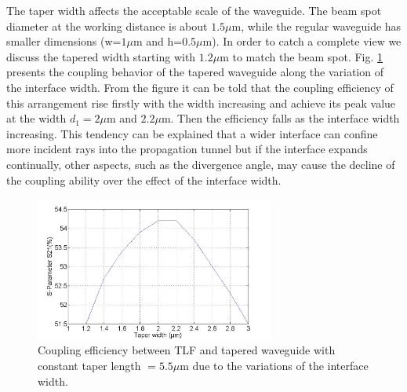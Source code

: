 The taper width affects the acceptable scale of the waveguide. The beam spot diameter at the working distance is about $1.5\mu$m, while the regular waveguide has smaller dimensions (w=$1\mu$m and h=$0.5\mu$m). In order to catch a complete view we discuss the tapered width starting with $1.2\mu$m to match the beam spot. Fig. \ref{fig:tapered_waveguide_wxx} presents the coupling behavior of the tapered waveguide along the variation of the interface width. From the figure it can be told that the coupling efficiency of this arrangement rise firstly with the width increasing and achieve its peak value at the width $d_{1}=2\mu$m and $2.2\mu$m. Then the efficiency falls as the interface width increasing. This tendency can be explained that a wider interface can confine more incident rays into the propagation tunnel but if the interface expands continually, other aspects, such as the divergence angle, may cause the decline of the coupling ability over the effect of the interface width. 

\begin{figure}[!ht]
\centering
\includegraphics[width=0.7\textwidth]{bilder/tapered_waveguide_wxx}
\caption{Coupling efficiency between TLF and tapered waveguide with constant taper length $= 5.5\mu$m due to the variations of the interface width.}
\label{fig:tapered_waveguide_wxx}
\end{figure}
